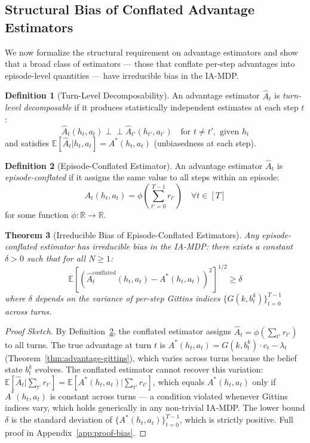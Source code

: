 \documentclass[11pt]{article}
\theoremstyle{plain}
\newtheorem{theorem}{Theorem}[section]
\theoremstyle{definition}
\newtheorem{definition}[theorem]{Definition}
\theoremstyle{remark}
\begin{document}
\subsection{Structural Bias of Conflated Advantage Estimators}

We now formalize the structural requirement on advantage 
estimators and show that a broad class of estimators — those 
that conflate per-step advantages into episode-level quantities 
— have irreducible bias in the IA-MDP.

\begin{definition}[Turn-Level Decomposability]
\label{def:decomposable}
An advantage estimator $\hat{A}_t$ is \emph{turn-level 
decomposable} if it produces statistically independent 
estimates at each step $t$:
$$\hat{A}_t(h_t, a_t) \perp\!\!\!\perp \hat{A}_{t'}(h_{t'}, a_{t'}) 
\quad \text{for } t \neq t', \text{ given } h_t$$
and satisfies $\mathbb{E}[\hat{A}_t | h_t, a_t] = 
A^*(h_t, a_t)$ (unbiasedness at each step).
\end{definition}

\begin{definition}[Episode-Conflated Estimator]
\label{def:conflated}
An advantage estimator $\hat{A}_t$ is \emph{episode-conflated} 
if it assigns the same value to all steps within an episode:
$$\hat{A}_t(h_t, a_t) = \phi\!\left(\sum_{t'=0}^{T-1} 
r_{t'}\right) \quad \forall t \in [T]$$
for some function $\phi: \mathbb{R} \rightarrow \mathbb{R}$.
\end{definition}

\begin{theorem}[Irreducible Bias of Episode-Conflated Estimators]
\label{thm:bias}
Any episode-conflated estimator has irreducible bias in the 
IA-MDP: there exists a constant $\delta > 0$ such that for 
all $N \geq 1$:
$$\mathbb{E}\!\left[\left(\hat{A}_t^{\mathrm{conflated}}(h_t, a_t) 
- A^*(h_t, a_t)\right)^2\right]^{1/2} \geq \delta$$
where $\delta$ depends on the variance of per-step Gittins 
indices $\{G(k, b_t^k)\}_{t=0}^{T-1}$ across turns.
\end{theorem}

\begin{proof}[Proof Sketch]
By Definition~\ref{def:conflated}, the conflated estimator 
assigns $\hat{A}_t = \phi(\sum_{t'} r_{t'})$ to all turns. 
The true advantage at turn $t$ is $A^*(h_t, a_t) = G(k, b_t^k) 
\cdot c_t - \lambda_t$ (Theorem~\ref{thm:advantage-gittins}), 
which varies across turns because the belief state $b_t^k$ 
evolves. The conflated estimator cannot recover this variation: 
$\mathbb{E}[\hat{A}_t | \sum_{t'} r_{t'}] = 
\mathbb{E}[A^*(h_t, a_t) | \sum_{t'} r_{t'}]$, which equals 
$A^*(h_t, a_t)$ only if $A^*(h_t, a_t)$ is constant across 
turns — a condition violated whenever Gittins indices vary, 
which holds generically in any non-trivial IA-MDP.
The lower bound $\delta$ is the standard deviation of 
$\{A^*(h_t, a_t)\}_{t=0}^{T-1}$, which is strictly positive.
Full proof in Appendix~\ref{app:proof-bias}.
\end{proof}
\end{document}
